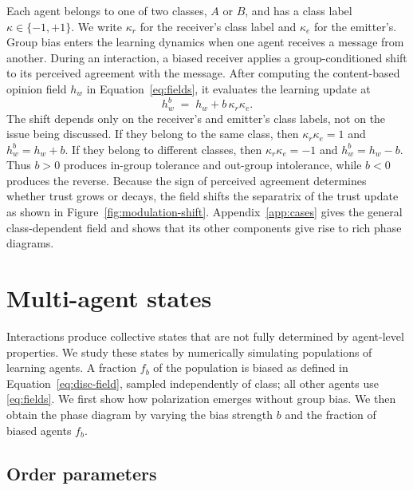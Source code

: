 \documentclass{article}
\newcommand{\hw}{h_{w}}
\newcommand{\fb}{f_{b}}
\begin{document}
Each agent belongs to one of two classes, $A$ or $B$, and has a class
label $\kappa\in\{-1,+1\}$. We write $\kappa_r$ for the receiver's class label
and $\kappa_e$ for the emitter's.
Group bias enters the learning dynamics when one agent receives a message from another.
During an interaction, a biased receiver applies a group-conditioned shift to its perceived agreement with the message.
After computing the content-based opinion field $\hw$ in Equation~\eqref{eq:fields},
it evaluates the learning update at
%
\begin{equation}
  \hw^{b} \;=\; \hw + b\,\kappa_r\kappa_e .
  \label{eq:disc-field}
\end{equation}
%
The shift depends only on the receiver's and emitter's class labels, not on the
issue being discussed. If they belong to the same class, then
$\kappa_r\kappa_e=1$ and
$\hw^b=\hw+b$. If they belong to different classes, then
$\kappa_r\kappa_e=-1$ and $\hw^b=\hw-b$. Thus $b>0$ produces in-group
tolerance and out-group intolerance, while $b<0$ produces the reverse. Because
the sign of perceived agreement determines whether trust grows or decays, the
field shifts the separatrix of the trust update as shown in
Figure~\ref{fig:modulation-shift}.
Appendix~\ref{app:cases} gives the general class-dependent field and shows that
its other components give rise to rich phase diagrams.

\section{Multi-agent states}
\label{sec:macro}

Interactions produce collective states that are not fully determined by
agent-level properties. We study these states by numerically simulating populations
of learning agents. A fraction $\fb$ of the population is biased as defined in
Equation~\eqref{eq:disc-field}, sampled independently of class; all other agents
use \eqref{eq:fields}. We first show how polarization emerges without group bias. We then obtain the phase diagram by varying the bias strength $b$ and the fraction of biased agents $\fb$.

\subsection{Order parameters}
\label{sec:no-disc}
\end{document}

